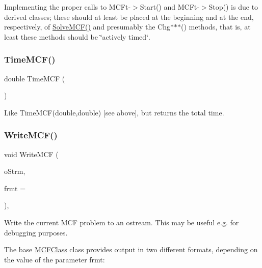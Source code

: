 Implementing the proper calls to M\+C\+Ft-\/$>$Start() and M\+C\+Ft-\/$>$Stop() is due to derived classes; these should at least be placed at the beginning and at the end, respectively, of \mbox{\hyperlink{class_m_c_f_class_ac0d96429d896a2d878a5f057535ab1ee}{Solve\+M\+C\+F()}} and presumably the Chg$\ast$$\ast$$\ast$() methods, that is, at least these methods should be \char`\"{}actively timed\char`\"{}. \mbox{\label{class_m_c_f_class_a25ce05b3fabc8d4f80332a02bce2a623}} 
\subsubsection{\texorpdfstring{Time\+M\+C\+F()}{TimeMCF()}\hspace{0.1cm}{\footnotesize\ttfamily [2/2]}}
{\footnotesize\ttfamily double Time\+M\+CF (\begin{DoxyParamCaption}\item[{void}]{ }\end{DoxyParamCaption})\hspace{0.3cm}{\ttfamily [inline]}}

Like Time\+M\+C\+F(double,double) \mbox{[}see above\mbox{]}, but returns the total time. \mbox{\label{class_m_c_f_class_acd008d9548bf3e1aef1291864171bb2d}} 
\subsubsection{\texorpdfstring{Write\+M\+C\+F()}{WriteMCF()}}
{\footnotesize\ttfamily void Write\+M\+CF (\begin{DoxyParamCaption}\item[{ostream \&}]{o\+Strm,  }\item[{int}]{frmt = {} }\end{DoxyParamCaption})\hspace{0.3cm}{\ttfamily [inline]}, {\ttfamily [virtual]}}

Write the current M\+CF problem to an ostream. This may be useful e.\+g. for debugging purposes.

The base \mbox{\hyperlink{class_m_c_f_class}{M\+C\+F\+Class}} class provides output in two different formats, depending on the value of the parameter frmt\+:


